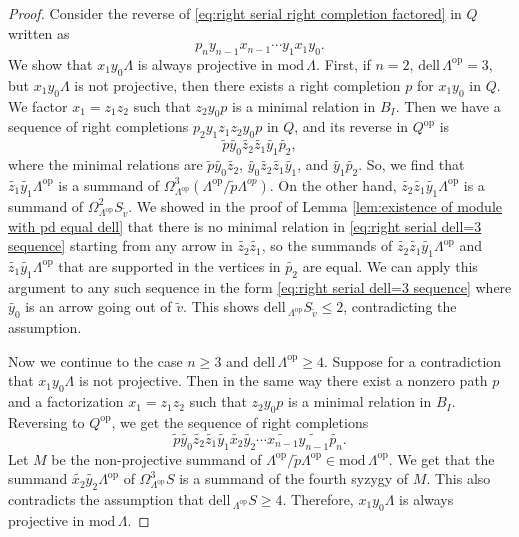 \documentclass{conm-p-l}
\newcommand{\dell}{\mathrm{dell}\,}
\renewcommand{\dell}{\mathrm{dell}\,}
\newcommand{\op}{\mathrm{op}}
\renewcommand{\mod}{\mathrm{mod}\,}
\theoremstyle{definition}
\theoremstyle{remark}
\numberwithin{equation}{section}
\begin{document}
\begin{proof}
Consider the reverse of \eqref{eq:right serial right completion factored} in $Q$ written as
\begin{equation}
\label{eq:right serial right completion reversed}
p_n y_{n-1}x_{n-1}\cdots y_1x_1y_0.
\end{equation}
We show that $x_1y_0\Lambda$ is always projective in $\mod\Lambda$. First, if $n=2$, $\dell\Lambda^{\op}=3$, but $x_1y_0\Lambda$ is not projective, then there exists a right completion $p$ for $x_1y_0$ in $Q$. We factor $x_1=z_1z_2$ such that $z_2y_0p$ is a minimal relation in $B_I$. Then we have a sequence of right completions $p_2y_1z_1z_2y_0p$ in $Q$, and its reverse in $Q^{\op}$ is
\begin{equation}
\label{eq:right serial dell=3 sequence}
\widetilde{p}\widetilde{y_0}\widetilde{z_2}\widetilde{z_1}\widetilde{y_1}\widetilde{p_2},
\end{equation}
where the minimal relations are $\widetilde{p}\widetilde{y_0}\widetilde{z_2}$, $\widetilde{y_0}\widetilde{z_2}\widetilde{z_1}\widetilde{y_1}$, and $\widetilde{y_1}\widetilde{p_2}$. So, we find that $\widetilde{z_1}\widetilde{y_1}\Lambda^{\op}$ is a summand of $\Omega^3_{\Lambda^{\op}} (\Lambda^{\op}/\widetilde{p}\Lambda^{op})$. On the other hand, $\widetilde{z_2}\widetilde{z_1}\widetilde{y_1}\Lambda^{\op}$ is a summand of $\Omega^2_{\Lambda^{\op}} S_{\tilde{v}}$. We showed in the proof of Lemma \ref{lem:existence of module with pd equal dell} that there is no minimal relation in \eqref{eq:right serial dell=3 sequence} starting from any arrow in $\widetilde{z_2}\widetilde{z_1}$, so the summands of $\widetilde{z_2}\widetilde{z_1}\widetilde{y_1}\Lambda^{\op}$ and $\widetilde{z_1}\widetilde{y_1}\Lambda^{\op}$ that are supported in the vertices in $\widetilde{p_2}$ are equal. We can apply this argument to any such sequence in the form \eqref{eq:right serial dell=3 sequence} where $\widetilde{y_0}$ is an arrow going out of $\tilde{v}$. This shows $\dell\!_{\Lambda^{\op}} S_{\tilde{v}} \leq 2$, contradicting the assumption.

Now we continue to the case $n\geq 3$ and $\dell\Lambda^{\op}\geq 4$. Suppose for a contradiction that $x_1y_0\Lambda$ is not projective. Then in the same way there exist a nonzero path $p$ and a factorization $x_1=z_1z_2$ such that $z_2y_0p$ is a minimal relation in $B_I$. Reversing to $Q^{\op}$, we get the sequence of right completions
\begin{equation}
\label{eq:right serial right completion factored additional term}
\widetilde{p}\widetilde{y_0}\widetilde{z_2}\widetilde{z_1}\widetilde{y_1}\widetilde{x_2}\widetilde{y_2} \cdots \widetilde{x_{n-1}}\widetilde{y_{n-1}}\widetilde{p_n}.
\end{equation}
Let $M$ be the non-projective summand of $\Lambda^{\op}/\tilde{p}\Lambda^{\op}\in\mod\Lambda^{\op}$. We get that the summand $\widetilde{x_2}\widetilde{y_2}\Lambda^{\op}$ of $\Omega_{\Lambda^{\op}}^3 S$ is a summand of the fourth syzygy of $M$. This also contradicts the assumption that $\dell\!_{\Lambda^{\op}} S\geq 4$. Therefore, $x_1y_0\Lambda$ is always projective in $\mod\Lambda$.


\end{proof}
\end{document}
